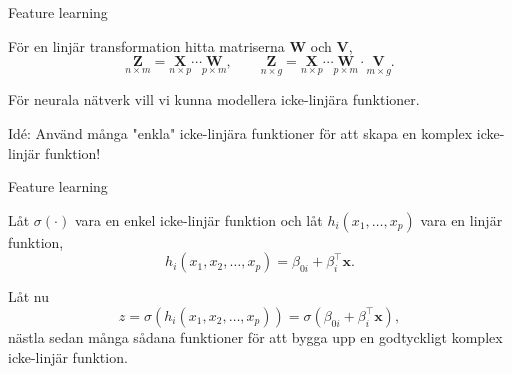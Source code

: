 \documentclass[10pt,english]{beamer}
\begin{document}
\begin{frame}{Feature learning}
    
    För en linjär transformation hitta matriserna $\mathbf{W}$ och $\mathbf{V}$,
    \begin{equation*}
        \underset{n \times m}{\mathbf{Z}} = \underset{n \times p}{\mathbf{X}} \cdots \underset{p \times m}{\mathbf{W}}, \qquad \underset{n \times g}{\mathbf{Z}} = \underset{n \times p}{\mathbf{X}} \cdots \underset{p \times m}{\mathbf{W}} \cdot \underset{m \times g}{\mathbf{V}}.
    \end{equation*}

    För neurala nätverk vill vi kunna modellera icke-linjära funktioner.

    Idé: Använd många "enkla" icke-linjära funktioner för att skapa en komplex icke-linjär funktion!

\end{frame}

\begin{frame}{Feature learning}

    \begin{greenbox}

        Låt $\sigma(\cdot)$ vara en enkel icke-linjär funktion och låt $h_i(x_1, \ldots, x_p)$ vara en linjär funktion,
        \begin{equation*}
            h_i(x_1, x_2, \ldots, x_p) = \beta_{0i} + \beta_i^{\top} \mathbf{x}.
        \end{equation*}

        Låt nu
        \begin{equation*}
            z = \sigma(h_i(x_1, x_2, \ldots, x_p)) = \sigma(\beta_{0i} + \beta_i^{\top} \mathbf{x}),
        \end{equation*}
        nästla sedan många sådana funktioner för att bygga upp en godtyckligt komplex icke-linjär funktion.
    \end{greenbox}
    
\end{frame}
\end{document}
